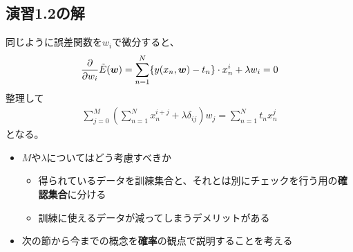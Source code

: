 \documentclass[a4j,11pt]{jarticle}
\def\v#1{\mbox{\boldmath $#1$}}
\def\pd#1#2{\frac{\partial #1}{\partial #2}}
\begin{document}
\subsection*{演習1.2の解}
同じように誤差関数を$w_i$で微分すると、
\begin{align*}
	\pd{}{w_i}\tilde{E}(\v{w}) &= \sum_{n=1}^{N}\{y(x_n, \v{w})-t_n\}\cdot x_n^{i}+\lambda w_i  = 0\nonumber \\
\end{align*}
整理して
\begin{align}
	\sum_{j=0}^{M}\left(\sum_{n=1}^N x_n^{i+j}+\lambda \delta_{ij}\right)w_j = \sum_{n=1}^{N}t_nx_n^j
\end{align}
となる。
\begin{itemize}
	\item $M$や$\lambda$についてはどう考慮すべきか
		\begin{itemize}
			\item 得られているデータを訓練集合と、それとは別にチェックを行う用の\textbf{確認集合}に分ける
			\item 訓練に使えるデータが減ってしまうデメリットがある
		\end{itemize}
	\item 次の節から今までの概念を\textbf{確率}の観点で説明することを考える
\end{itemize}
\newpage
\end{document}
